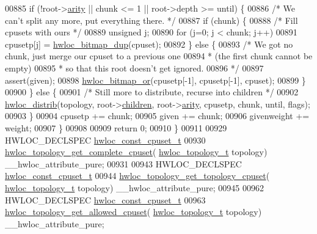 \begin{DoxyCode}
00885     \textcolor{keywordflow}{if} (!root->\hyperlink{a00238_aac3f6da35c9b57599909a44ce2b716c1}{arity} || chunk <= 1 || root->depth >= until) \{
00886       \textcolor{comment}{/* We can't split any more, put everything there.  */}
00887       \textcolor{keywordflow}{if} (chunk) \{
00888         \textcolor{comment}{/* Fill cpusets with ours */}
00889         \textcolor{keywordtype}{unsigned} j;
00890         \textcolor{keywordflow}{for} (j=0; j < chunk; j++)
00891           cpusetp[j] = \hyperlink{a00205_gae679434c1a5f41d3560a8a7e2c1b0dee}{hwloc\_bitmap\_dup}(cpuset);
00892       \} \textcolor{keywordflow}{else} \{
00893         \textcolor{comment}{/* We got no chunk, just merge our cpuset to a previous one}
00894 \textcolor{comment}{         * (the first chunk cannot be empty)}
00895 \textcolor{comment}{         * so that this root doesn't get ignored.}
00896 \textcolor{comment}{         */}
00897         assert(given);
00898         \hyperlink{a00205_ga120b8aefb9ce7ef349929656359b1859}{hwloc\_bitmap\_or}(cpusetp[-1], cpusetp[-1], cpuset);
00899       \}
00900     \} \textcolor{keywordflow}{else} \{
00901       \textcolor{comment}{/* Still more to distribute, recurse into children */}
00902       \hyperlink{a00201_ga7b0c28f797c2ff17fa2f244ebbd55b33}{hwloc\_distrib}(topology, root->\hyperlink{a00238_a04d05403da37bfe17cd63b7c7dd07b1f}{children}, root->\hyperlink{a00238_aac3f6da35c9b57599909a44ce2b716c1}{arity}, cpusetp, chunk, until,
       flags);
00903     \}
00904     cpusetp += chunk;
00905     given += chunk;
00906     givenweight += weight;
00907   \}
00908 
00909   \textcolor{keywordflow}{return} 0;
00910 \}
00911 
00929 HWLOC\_DECLSPEC \hyperlink{a00183_ga1f784433e9b606261f62d1134f6a3b25}{hwloc\_const\_cpuset\_t}
00930 \hyperlink{a00202_gaee30e03391c1ed7dfd617fb5c7bbb033}{hwloc\_topology\_get\_complete\_cpuset}(
      \hyperlink{a00186_ga9d1e76ee15a7dee158b786c30b6a6e38}{hwloc\_topology\_t} topology) \_\_hwloc\_attribute\_pure;
00931 
00943 HWLOC\_DECLSPEC \hyperlink{a00183_ga1f784433e9b606261f62d1134f6a3b25}{hwloc\_const\_cpuset\_t}
00944 \hyperlink{a00202_ga79212faa07b70dd26588941b17d9fa82}{hwloc\_topology\_get\_topology\_cpuset}(
      \hyperlink{a00186_ga9d1e76ee15a7dee158b786c30b6a6e38}{hwloc\_topology\_t} topology) \_\_hwloc\_attribute\_pure;
00945 
00962 HWLOC\_DECLSPEC \hyperlink{a00183_ga1f784433e9b606261f62d1134f6a3b25}{hwloc\_const\_cpuset\_t}
00963 \hyperlink{a00202_ga517d5d68ec9f24583d8933aab713be8e}{hwloc\_topology\_get\_allowed\_cpuset}(
      \hyperlink{a00186_ga9d1e76ee15a7dee158b786c30b6a6e38}{hwloc\_topology\_t} topology) \_\_hwloc\_attribute\_pure;

\end{DoxyCode}
